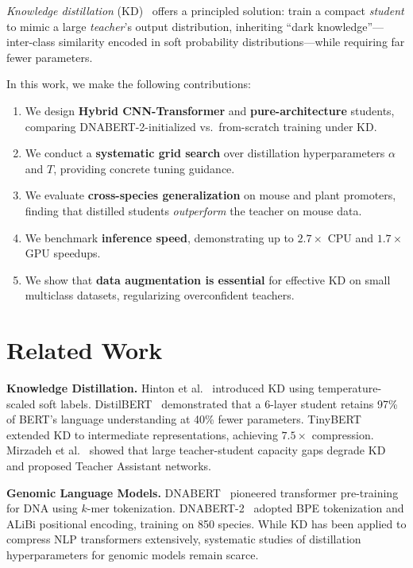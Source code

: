 \documentclass[conference]{IEEEtran}
\begin{document}
\emph{Knowledge distillation} (KD)~\cite{hinton2015distilling} offers a principled solution: train a compact \emph{student} to mimic a large \emph{teacher}'s output distribution, inheriting ``dark knowledge''---inter-class similarity encoded in soft probability distributions---while requiring far fewer parameters.

In this work, we make the following contributions:
\begin{enumerate}
    \item We design \textbf{Hybrid CNN-Transformer} and \textbf{pure-architecture} students, comparing DNABERT-2-initialized vs.\ from-scratch training under KD.
    \item We conduct a \textbf{systematic grid search} over distillation hyperparameters $\alpha$ and $T$, providing concrete tuning guidance.
    \item We evaluate \textbf{cross-species generalization} on mouse and plant promoters, finding that distilled students \emph{outperform} the teacher on mouse data.
    \item We benchmark \textbf{inference speed}, demonstrating up to $2.7\times$ CPU and $1.7\times$ GPU speedups.
    \item We show that \textbf{data augmentation is essential} for effective KD on small multiclass datasets, regularizing overconfident teachers.
\end{enumerate}

\section{Related Work}
\label{sec:related}

\textbf{Knowledge Distillation.}\quad
Hinton et al.~\cite{hinton2015distilling} introduced KD using temperature-scaled soft labels.
DistilBERT~\cite{sanh2019distilbert} demonstrated that a 6-layer student retains 97\% of BERT's language understanding at 40\% fewer parameters.
TinyBERT~\cite{jiao2020tinybert} extended KD to intermediate representations, achieving $7.5\times$ compression.
Mirzadeh et al.~\cite{mirzadeh2020improved} showed that large teacher-student capacity gaps degrade KD and proposed Teacher Assistant networks.

\textbf{Genomic Language Models.}\quad
DNABERT~\cite{ji2021dnabert} pioneered transformer pre-training for DNA using $k$-mer tokenization.
DNABERT-2~\cite{zhou2023dnabert2} adopted BPE tokenization and ALiBi positional encoding, training on 850 species.
While KD has been applied to compress NLP transformers extensively, systematic studies of distillation hyperparameters for genomic models remain scarce.
\end{document}
